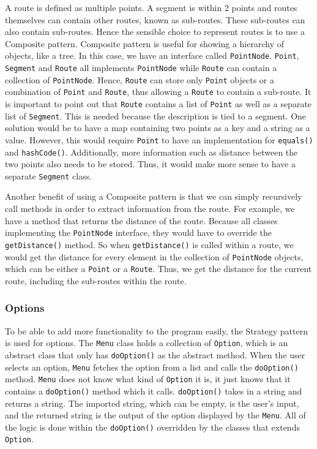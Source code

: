 \documentclass[a4paper, 12pt, titlepage]{article}
\newcommand{\code}[1]{\small\texttt{#1}\normalsize}
\begin{document}
A route is defined as multiple points. A segment is within 2 points and routes
themselves can contain other routes, known as sub-routes. These sub-routes can
also contain sub-routes. Hence the sensible choice to represent routes is to
use a Composite pattern. Composite pattern is useful for showing a hierarchy of
objects, like a tree. In this case, we have an interface called
\code{PointNode}. \code{Point}, \code{Segment} and \code{Route} all implements
\code{PointNode} while \code{Route} can contain a collection of
\code{PointNode}. Hence, \code{Route} can store only \code{Point} objects or a
combination of \code{Point} and \code{Route}, thus allowing a \code{Route} to
contain a sub-route. It is important to point out that \code{Route} contains a
list of \code{Point} as well as a separate list of \code{Segment}. This is
needed because the description is tied to a segment. One solution would be to
have a map containing two points as a key and a string as a value. However,
this would require \code{Point} to have an implementation for \code{equals()}
and \code{hashCode()}. Additionally, more information such as distance between
the two points also needs to be stored. Thus, it would make more sense to have
a separate \code{Segment} class.

Another benefit of using a Composite pattern is that we can simply recursively
call methods in order to extract information from the route. For example, we
have a method that returns the distance of the route. Because all classes
implementing the \code{PointNode} interface, they would have to override the
\code{getDistance()} method. So when \code{getDistance()} is called within a
route, we would get the distance for every element in the collection of
\code{PointNode} objects, which can be either a \code{Point} or a \code{Route}.
Thus, we get the distance for the current route, including the sub-routes
within the route.


\subsubsection{Options}

To be able to add more functionality to the program easily, the Strategy
pattern is used for options. The \code{Menu} class holds a collection of
\code{Option}, which is an abstract class that only has \code{doOption()} as
the abstract method. When the user selects an option, \code{Menu} fetches the
option from a list and calls the \code{doOption()} method. \code{Menu} does not
know what kind of \code{Option} it is, it just knows that it contains a
\code{doOption()} method which it calls. \code{doOption()} takes in a string
and returns a string. The imported string, which can be empty, is the user's
input, and the returned string is the output of the option displayed by the
\code{Menu}. All of the logic is done within the \code{doOption()} overridden
by the classes that extends \code{Option}.
\end{document}
